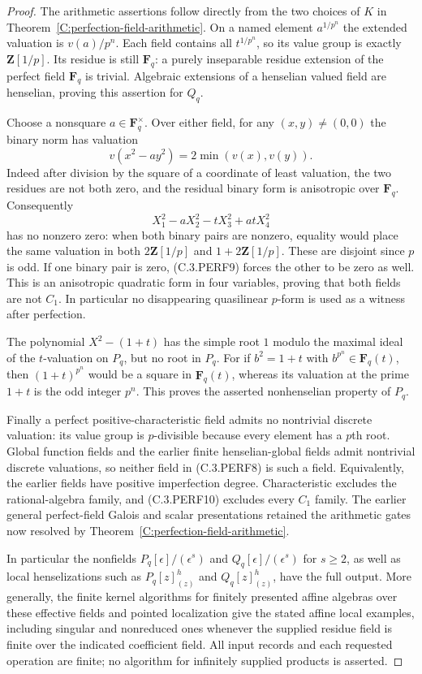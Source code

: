 \begin{proof}
The arithmetic assertions follow directly from the two choices of
$K$ in Theorem~\ref{C:perfection-field-arithmetic}.
On a named element $a^{1/p^n}$ the extended valuation is
$v(a)/p^n$.  Each field contains all $t^{1/p^n}$, so its value group
is exactly $\mathbf Z[1/p]$.  Its residue is still $\mathbf F_q$:
a purely inseparable residue extension of the perfect field
$\mathbf F_q$ is trivial.  Algebraic extensions of a henselian
valued field are henselian, proving this assertion for $Q_q$.

Choose a nonsquare $a\in\mathbf F_q^\times$.  Over either field,
for any $(x,y)\ne(0,0)$ the binary norm has valuation
\[
                       v(x^2-ay^2)=2\min(v(x),v(y)).    \tag{C.3.PERF9}
\]
Indeed after division by the square of a coordinate of least
valuation, the two residues are not both zero, and the residual
binary form is anisotropic over $\mathbf F_q$.
Consequently
\[
                       X_1^2-aX_2^2-tX_3^2+atX_4^2    \tag{C.3.PERF10}
\]
has no nonzero zero: when both binary pairs are nonzero, equality
would place the same valuation in both
$2\mathbf Z[1/p]$ and $1+2\mathbf Z[1/p]$.
These are disjoint since $p$ is odd.  If one binary pair is zero,
(C.3.PERF9) forces the other to be zero as well.
This is an anisotropic quadratic form in four variables, proving
that both fields are not $C_1$.  In particular no disappearing
quasilinear $p$-form is used as a witness after perfection.

The polynomial $X^2-(1+t)$ has the simple root $1$ modulo the
maximal ideal of the $t$-valuation on $P_q$, but no root in $P_q$.
For if $b^2=1+t$ with $b^{p^n}\in\mathbf F_q(t)$, then
$(1+t)^{p^n}$ would be a square in $\mathbf F_q(t)$, whereas its
valuation at the prime $1+t$ is the odd integer $p^n$.
This proves the asserted nonhenselian property of $P_q$.

Finally a perfect positive-characteristic field admits no nontrivial
discrete valuation: its value group is $p$-divisible because every
element has a $p$th root.  Global function fields and the earlier
finite henselian-global fields admit nontrivial discrete valuations,
so neither field in (C.3.PERF8) is such a field.  Equivalently,
the earlier fields have positive imperfection degree.
Characteristic excludes the rational-algebra family, and
(C.3.PERF10) excludes every $C_1$ family.  The earlier general
perfect-field Galois and scalar presentations retained the arithmetic
gates now resolved by Theorem~\ref{C:perfection-field-arithmetic}.

In particular the nonfields $P_q[\epsilon]/(\epsilon^s)$ and
$Q_q[\epsilon]/(\epsilon^s)$ for $s\ge2$, as well as local
henselizations such as $P_q[z]_{(z)}^h$ and $Q_q[z]_{(z)}^h$,
have the full output.  More generally, the finite kernel algorithms
for finitely presented affine algebras over these effective fields
and pointed localization give the stated affine local examples,
including singular and nonreduced ones whenever the supplied
residue field is finite over the indicated coefficient field.
All input records and each requested operation are finite; no
algorithm for infinitely supplied products is asserted.
\end{proof}
